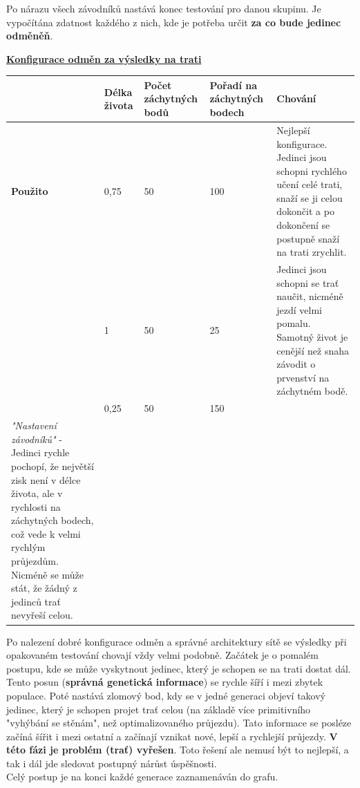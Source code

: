 \documentclass[a4paper,12pt]{article}
\newcommand{\tab}
{
    \hspace*{1em}
}
\begin{document}
            \tab Po nárazu všech závodníků nastává konec testování pro danou skupinu.
            Je vypočítána zdatnost každého z nich, kde je potřeba určit \textbf{za co bude jedinec
            odměněň}. 
            
            \underline{\textbf{Konfigurace odměn za výsledky na trati}}
            \begin{tabular}[c]{ | l | l | l | l | p{5cm} | }
                \hline
                 & Délka života & Počet záchytných bodů & Pořadí na záchytných bodech & Chování \\ \hline
                \textbf{Použito} & 0,75 & 50 & 100 & Nejlepší konfigurace. Jedinci jsou schopni rychlého učení celé trati,
                snaží se ji celou dokončit a po dokončení se postupně snaží na trati zrychlit.\\ \hline
                          & 1 & 50 & 25 & Jedinci jsou schopni se trať naučit, nicméně jezdí velmi pomalu.
                Samotný život je cenější než snaha závodit o prvenství na záchytném bodě.\\ \hline
                          & 0,25 & 50 & 150 &  \\ \textit{"Nastavení závodníků"} - Jedinci rychle
                pochopí, že největší zisk není v délce života, ale v rychlosti na záchytných bodech,
                což vede k velmi rychlým průjezdům. Nicméně se může stát, že žádný z jedinců trať nevyřeší celou.\hline
                \label{tab:config}
            \end{tabular}

            \tab Po nalezení dobré konfigurace odměn a správné architektury sítě
            se výsledky při opakovaném testování chovají vždy velmi podobně.
            Začátek je o pomalém postupu, kde se může vyskytnout jedinec, který
            je schopen se na trati dostat dál. Tento posun (\textbf{správná genetická informace})
            se rychle šíří i mezi zbytek populace. Poté nastává zlomový bod, kdy se
            v jedné generaci objeví takový jedinec, který je schopen projet trať celou
            (na základě více primitivního "vyhýbání se stěnám", než optimalizovaného průjezdu). 
            Tato informace se posléze začíná šířit i mezi ostatní a začínají vznikat nové,
            lepší a rychlejší průjezdy. \textbf{V této fázi je problém (trať) vyřešen}.
            Toto řešení ale nemusí být to nejlepší, a tak i dál jde sledovat postupný nárůst
            úspěšnosti.\\
            \tab Celý postup je na konci každé generace zaznamenáván do grafu.
\end{document}
